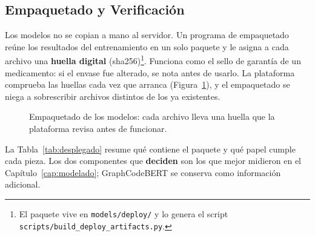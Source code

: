 \subsection{Empaquetado y Verificación}
\label{subsec:empaquetado}

Los modelos no se copian a mano al servidor. Un programa de empaquetado reúne los resultados del entrenamiento en un solo paquete y le asigna a cada archivo una \textbf{huella digital} (sha256)\footnote{El paquete vive en \texttt{models/deploy/} y lo genera el script \texttt{scripts/build\_deploy\_artifacts.py}.}. Funciona como el sello de garantía de un medicamento: si el envase fue alterado, se nota antes de usarlo. La plataforma comprueba las huellas cada vez que arranca (Figura~\ref{fig:empaquetado}), y el empaquetado se niega a sobrescribir archivos distintos de los ya existentes.

\begin{figure}[H]
    \centering
    \caption{Empaquetado de los modelos: cada archivo lleva una huella que la plataforma revisa antes de funcionar.}
    \label{fig:empaquetado}
\end{figure}

La Tabla~\ref{tab:desplegado} resume qué contiene el paquete y qué papel cumple cada pieza. Los dos componentes que \textbf{deciden} son los que mejor midieron en el Capítulo~\ref{cap:modelado}; GraphCodeBERT se conserva como información adicional.


